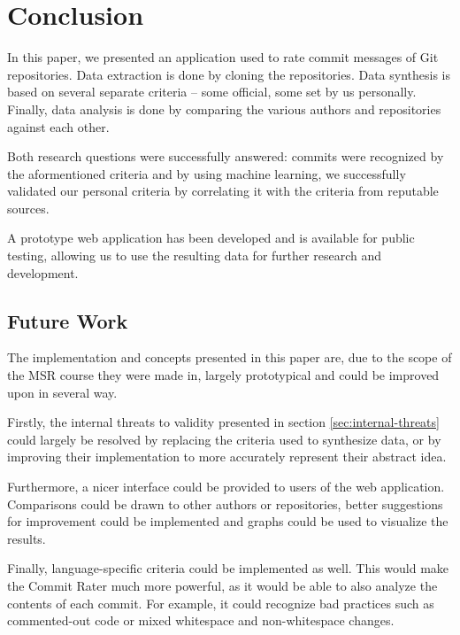 \section{Conclusion}
\label{sec:conclusion}

In this paper, we presented an application used to rate commit messages of Git repositories. Data extraction is done by cloning the repositories. Data synthesis is based on several separate criteria -- some official, some set by us personally. Finally, data analysis is done by comparing the various authors and repositories against each other.

Both research questions were successfully answered: commits were recognized by the aformentioned criteria and by using machine learning, we successfully validated our personal criteria by correlating it with the criteria from reputable sources.

A prototype web application has been developed and is available for public testing, allowing us to use the resulting data for further research and development.


\subsection{Future Work}
\label{sec:future-work}

The implementation and concepts presented in this paper are, due to the scope of the MSR course they were made in, largely prototypical and could be improved upon in several way.

Firstly, the internal threats to validity presented in section \ref{sec:internal-threats} could largely be resolved by replacing the criteria used to synthesize data, or by improving their implementation to more accurately represent their abstract idea.

Furthermore, a nicer interface could be provided to users of the web application. Comparisons could be drawn to other authors or repositories, better suggestions for improvement could be implemented and graphs could be used to visualize the results.

Finally, language-specific criteria could be implemented as well. This would make the Commit Rater much more powerful, as it would be able to also analyze the contents of each commit. For example, it could recognize bad practices such as commented-out code or mixed whitespace and non-whitespace changes.

